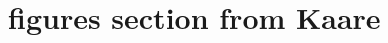 \documentclass[twocolumn,amsmath,amssymb,floatfix]{revtex4}
\begin{document}
\section{figures section from Kaare}
\end{document}
